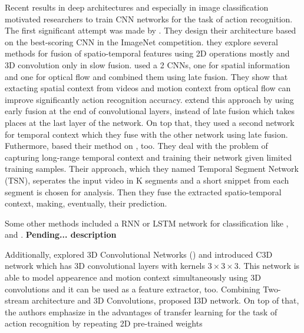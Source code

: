 Recent results in deep architectures and especially in image classification motivated researchers to train CNN networks for
the task of action recognition. The first significant attempt was made by \cite{6909619}. They design their architecture based on the best-scoring CNN
in the ImageNet competition. they explore several methods for fusion of spatio-temporal features using 2D operations mostly and 3D convolution only in slow fusion.
\cite{simonyan2014two}  used a 2 CNNs, one for spatial information and one for optical flow and combined them using late fusion.
They show that extacting spatial context from videos and motion context from optical flow can improve significantly action recognition accuracy.
\cite{DBLP:journals/corr/FeichtenhoferPZ16} extend this approach by using early fusion at the end of convolutional layers,  instead of late fusion which
takes places at the last layer of the network. On top that, they used a second network for temporal context which they fuse with the other network using late
fusion. Futhermore, \cite{DBLP:journals/corr/WangXW0LTG16} based their method on \cite{simonyan2014two}, too. They deal with the problem of capturing long-range
temporal context and training their network given limited training samples. Their approach, which they named Temporal Segment Network (TSN), seperates the input
video in K segments and a short snippet from each segment is chosen for analysis. Then they fuse  the extracted spatio-temporal context, making, eventually, their
prediction. \par
Some other methods included a RNN or LSTM network for classification like \cite{DBLP:journals/corr/DonahueHGRVSD14}, \cite{DBLP:journals/corr/NgHVVMT15} and
\cite{DBLP:journals/corr/MaCKA17}. \textbf{Pending... description} \par
Additionally, \cite{Tran2014LearningSF} explored 3D Convolutional Networks (\cite{pmid:22392705}) and introduced C3D network which  has
3D convolutional layers with kernels $ 3 \times 3 \times 3$.
This network is able to  model appearence and motion context simultaneously using 3D convolutions and it can be used as a feature extractor, too.
Combining Two-stream architecture and 3D Convolutions, \cite{DBLP:journals/corr/CarreiraZ17} proposed
I3D network. On top of that, the authors emphasize in the advantages of transfer learning for the task of action recognition by repeating 2D pre-trained weights
